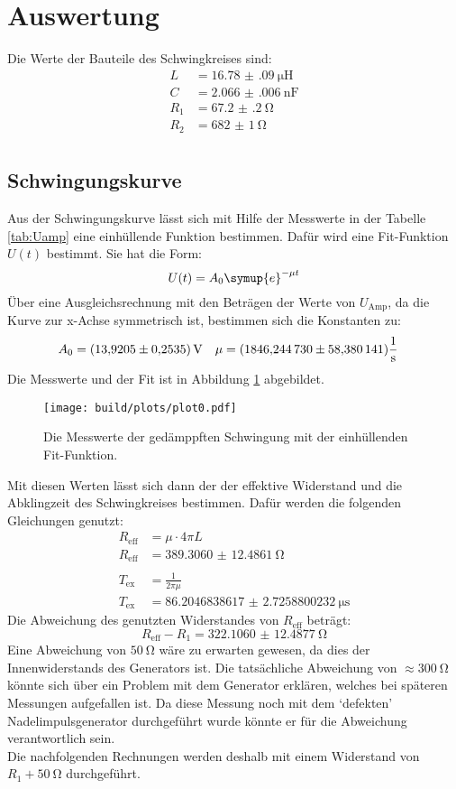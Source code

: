 \newpage
\section{Auswertung}
Die Werte der Bauteile des Schwingkreises sind:
\begin{align*}
    L&=\SI{16.78(09)}{\micro\henry}\\
    C&=\SI{2.066(006)}{\nano\farad}\\
    R_1&=\SI{67.2(2)}{\ohm}\\
    R_2&=\SI{682(1)}{\ohm}\\
\end{align*}
\subsection{Schwingungskurve}
\noindent
Aus der Schwingungskurve lässt sich mit Hilfe der Messwerte in der Tabelle \ref{tab:Uamp} eine einhüllende Funktion bestimmen. 
Dafür wird eine Fit-Funktion $U(t)$ bestimmt. Sie hat die Form:
\begin{equation}
    U(t)=A_0 \symup{e}^{-\mu t} \nonumber
\end{equation}
Über eine Ausgleichsrechnung mit den Beträgen der Werte von $U_\text{Amp}$, da die Kurve zur x-Achse symmetrisch ist,
bestimmen sich die Konstanten zu:
\begin{align*}
    A_0&=\SI{13.9205(2535)}{\V} & \mu&=(\num{1846.24473 \pm 58.380141 }) \mathrm{\frac{1}{s}} 
\end{align*}
Die Messwerte und der Fit ist in Abbildung \ref{img:huell} abgebildet.
\begin{figure}[H]
    \centering
    \texttt{[image: build/plots/plot0.pdf]}
    \caption{Die Messwerte der gedämppften Schwingung mit der einhüllenden Fit-Funktion.}
    \label{img:huell}
\end{figure}
\noindent
Mit diesen Werten lässt sich dann der der effektive Widerstand und die Abklingzeit des Schwingkreises bestimmen. 
Dafür werden die folgenden Gleichungen genutzt:
\begin{align*}
    R_\text{eff}&=\mu \cdot 4\pi L\\
    R_\text{eff}&= \SI{389.3060(124861)}{\ohm}  \\\\
    T_\text{ex}&=\frac{1}{2\pi\mu}\\
    T_\text{ex}&=\SI{86.2046838617(27258800232)}{\micro\second}
\end{align*}
Die Abweichung des genutzten Widerstandes von $R_\text{eff}$ beträgt:
\begin{equation}
    R_\text{eff}-R_1=\SI{322.1060(124877)}{\ohm}
\end{equation}
Eine Abweichung von $\SI{50}{\ohm}$ wäre zu erwarten gewesen, da dies der Innenwiderstands des Generators ist.
Die tatsächliche Abweichung von $\approx \SI{300}{\ohm}$ könnte sich über ein Problem mit dem Generator erklären, welches bei späteren Messungen 
aufgefallen ist. Da diese Messung noch mit dem \enquote*{defekten} Nadelimpulsgenerator durchgeführt wurde könnte er für die Abweichung verantwortlich sein.\\
Die nachfolgenden Rechnungen werden deshalb mit einem Widerstand von $R_1+\SI{50}{\ohm}$ durchgeführt.

